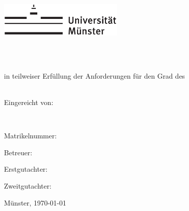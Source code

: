 \begin{centering}
\includegraphics[width=6cm]{./img/Logo_UniMuenster_2023_100K.pdf}

\vspace{1cm} 

{\LARGE
	\textbf{\printtitle}\\[2cm]
}

{\large
	\large
    \textsc{\printtype} \\
    	\normalsize
	in teilweiser Erfüllung der Anforderungen für den Grad des\\
	\large
    \textsc{\printdegree} \\[2cm]
}

{\large
	Eingereicht von:
}

{ \Large
	\textbf{\printname}\\[0.8cm]
}

{\large
	Matrikelnummer: \printnumber\\[0.8cm]
}

\end{centering}

\par
\vspace*{2ex}
Betreuer:\\
\large
\textit{\printsupervisor}

\par
\normalsize
\vspace*{1ex}
Erstgutachter:\\
\large
\textit{\printfirstassessor}

\par
\normalsize
\vspace*{0.5ex}
Zweitgutachter:\\
\large
\textit{\printsecondassessor}

{\large
Münster, \today
}
\vfill
